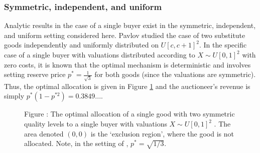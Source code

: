 \subsubsection{Symmetric, independent, and uniform}

Analytic results in the case of a single buyer exist in the symmetric, independent, and uniform setting considered here. Pavlov \autocite*{pavlov2011optimal} studied the case of two substitute goods independently and uniformly distributed on $U[c,c+1]^2$. In the specific case of a single buyer with valuations distributed according to $X \sim U[0,1]^2$ with zero costs, it is known that the optimal mechanism is deterministic and involves setting reserve price $p^* =\frac{1}{\sqrt{3}}$ for both goods (since the valuations are symmetric). Thus, the optimal allocation is given in Figure \ref{fig:pavlov_alloc} and the auctioneer's revenue is simply $p^*( 1 - p^{*2} ) = 0.3849...$.
 
\begin{figure}[H]
    \begin{center}
    \end{center}
  
    \vspace{1mm}
    \raggedright{\small {\sc Figure \thefig\label{fig:pavlov_alloc}:} The optimal allocation of a single good with two symmetric quality levels to a single buyer with valuations $X \sim U[0,1]^2$ \autocite{pavlov2011optimal}. The area denoted $(0,0)$ is the `exclusion region', where the good is not allocated. Note, in the setting of \autocite{pavlov2011optimal}, $p^*=\sqrt{1/3}$.}
\end{figure}

